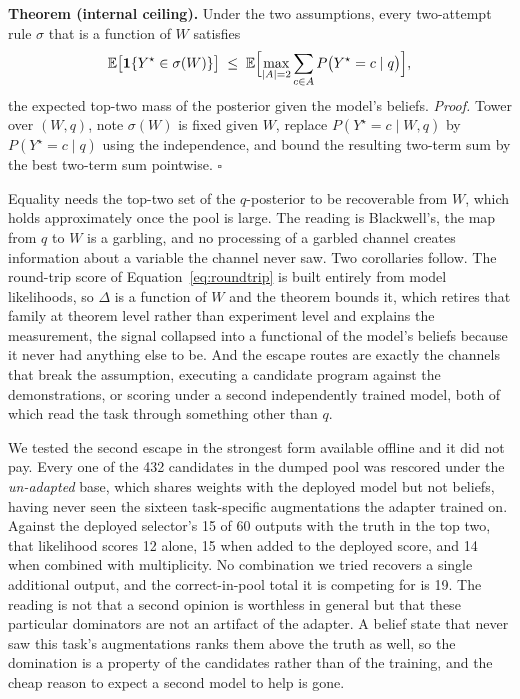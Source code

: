 \documentclass[11pt]{article}
\begin{document}
\textbf{Theorem (internal ceiling).} Under the two assumptions, every two-attempt rule $\sigma$ that is
a function of $W$ satisfies
\begin{equation}
\mathbb{E}\bigl[\mathbf{1}\{Y^\star \in \sigma(W)\}\bigr] \;\le\;
\mathbb{E}\Bigl[\max_{|A|=2}\sum_{c \in A} P\bigl(Y^\star = c \mid q\bigr)\Bigr],
\label{eq:ceiling}
\end{equation}
the expected top-two mass of the posterior given the model's beliefs. \textit{Proof.} Tower over
$(W, q)$, note $\sigma(W)$ is fixed given $W$, replace $P(Y^\star = c \mid W, q)$ by
$P(Y^\star = c \mid q)$ using the independence, and bound the resulting two-term sum by the best
two-term sum pointwise. \hfill$\square$

Equality needs the top-two set of the $q$-posterior to be recoverable from $W$, which holds
approximately once the pool is large. The reading is Blackwell's, the map from $q$ to $W$ is a garbling,
and no processing of a garbled channel creates information about a variable the channel never saw. Two
corollaries follow. The round-trip score of Equation~\eqref{eq:roundtrip} is built entirely from model
likelihoods, so $\Delta$ is a function of $W$ and the theorem bounds it, which retires that family at
theorem level rather than experiment level and explains the measurement, the signal collapsed into a
functional of the model's beliefs because it never had anything else to be. And the escape routes are
exactly the channels that break the assumption, executing a candidate program against the
demonstrations, or scoring under a second independently trained model, both of which read the task
through something other than $q$.

We tested the second escape in the strongest form available offline and it did not pay. Every one of
the 432 candidates in the dumped pool was rescored under the \emph{un-adapted} base, which shares
weights with the deployed model but not beliefs, having never seen the sixteen task-specific
augmentations the adapter trained on. Against the deployed selector's 15 of 60 outputs with the truth
in the top two, that likelihood scores 12 alone, 15 when added to the deployed score, and 14 when
combined with multiplicity. No combination we tried recovers a single additional output, and the
correct-in-pool total it is competing for is 19. The reading is not that a second opinion is worthless
in general but that these particular dominators are not an artifact of the adapter. A belief state that
never saw this task's augmentations ranks them above the truth as well, so the domination is a property
of the candidates rather than of the training, and the cheap reason to expect a second model to help is
gone.
\end{document}

